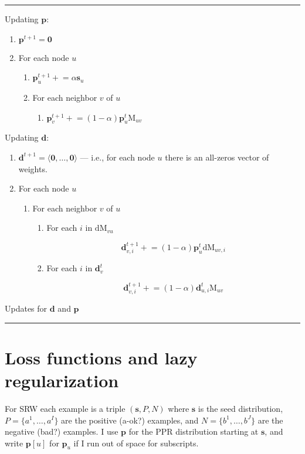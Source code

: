\documentclass[12pt]{article}
\newcommand{\vek}[1]{\textbf{#1}}
\newcommand{\M}{\textrm{M}}
\newcommand{\dM}{\textrm{dM}}
\begin{document}
\begin{table} %
\hrule

Updating $\vek{p}$:
\begin{enumerate}
\item $\vek{p}^{t+1} = \vek{0}$
\item For each node $u$ 
  \begin{enumerate}
  \item $\vek{p}^{t+1}_u +\!\!= \alpha \vek{s}_u$
  \item For each neighbor $v$ of $u$
    \begin{enumerate}
    \item $\vek{p}^{t+1}_v +\!\!= (1-\alpha) \vek{p}^t_u \M_{uv} $
    \end{enumerate}
  \end{enumerate}
\end{enumerate}

Updating $\vek{d}$:
\begin{enumerate}
\item $\vek{d}^{t+1} = \langle \vek{0}, \ldots, \vek{0} \rangle$ --- i.e., for each node $u$ there is an all-zeros
  vector of weights.
\item For each node $u$ 
  \begin{enumerate}
  \item For each neighbor $v$ of $u$
    \begin{enumerate}
      \item For each $i$ in $\dM_{vu}$

      \[ \vek{d}^{t+1}_{v,i} +\!\!= (1-\alpha) \vek{p}^t_u \dM_{uv,i} \]
      \item For each $i$ in $\vek{d}^t_{v}$

      \[ \vek{d}^{t+1}_{v,i} +\!\!= (1-\alpha) \vek{d}^t_{u,i} \M_{uv} \]
    \end{enumerate}
  \end{enumerate}
\end{enumerate}
\caption{Updates for $\vek{d}$ and $\vek{p}$} \label{alg:updates}
\hrule
\end{table}

\section{Loss functions and lazy regularization}

For SRW each example is a triple $(\vek{s},P,N)$ where $\vek{s}$ is
the seed distribution, $P=\{a^1,\ldots,a^I\}$ are the positive (a-ok?)
examples, and $N=\{b^1,\ldots,b^J\}$ are the negative (bad?) examples.
I use $\vek{p}$ for the PPR distribution starting at $\vek{s}$, and
write $\vek{p}[u]$ for $\vek{p}_u$ if I run out of space for
subscripts.
\end{document}
